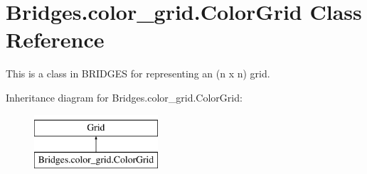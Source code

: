 \hypertarget{class_bridges_1_1color__grid_1_1_color_grid}{}\section{Bridges.\+color\+\_\+grid.\+Color\+Grid Class Reference}
\label{class_bridges_1_1color__grid_1_1_color_grid}


This is a class in B\+R\+I\+D\+G\+E\+S for representing an (n x n) grid.  


Inheritance diagram for Bridges.\+color\+\_\+grid.\+Color\+Grid\+:\begin{figure}[H]
\begin{center}
\leavevmode
\includegraphics[height=2.000000cm]{class_bridges_1_1color__grid_1_1_color_grid}
\end{center}
\end{figure}
